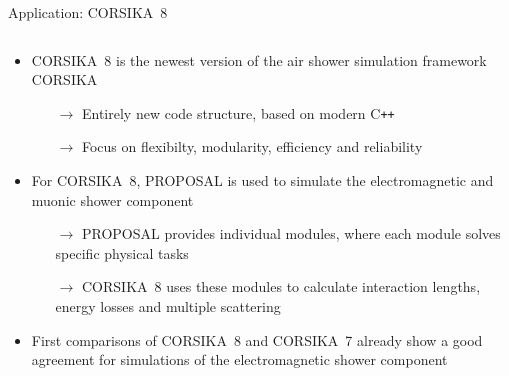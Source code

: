 \documentclass[t]{beamer}
\newlength{\itemseparation}
\begin{document}
  \begin{columns}[onlytextwidth]%
    \begin{column}{0.6\textwidth}%
      \begin{block}[equal height group=B]{Application: CORSIKA~8}%
          \begin{columns}[onlytextwidth]  
            \begin{column}{0.6\textwidth}%
              \begin{itemize}
                \setlength\itemsep{\itemseparation}
                \item CORSIKA~8 is the newest version of the air shower simulation framework CORSIKA
                \begin{itemize}
                  \setlength\itemsep{\itemseparation}
                  \item[$\rightarrow$] Entirely new code structure, based on modern C\texttt{++} 
                  \item[$\rightarrow$] Focus on flexibilty, modularity, efficiency and reliability \cite{Engel2018}
                \end{itemize}
                \item For CORSIKA~8, PROPOSAL is used to simulate the electromagnetic and muonic shower component
                \begin{itemize}
                  \setlength\itemsep{\itemseparation}
                  \item[$\rightarrow$] PROPOSAL provides individual modules, where each module solves specific physical tasks \cite{Alameddine_2020}
                  \item[$\rightarrow$] CORSIKA~8 uses these modules to calculate interaction lengths, energy losses and multiple scattering 
                \end{itemize}
                \item First comparisons of CORSIKA~8 and CORSIKA~7 already show a good agreement for simulations of the electromagnetic shower component \cite{Alameddine:2021iq}
              \end{itemize}

\vspace{2em}
\begin{center}
        \colorbox{light-gray}{
      \begin{minipage}{0.85\linewidth}



\end{minipage}}
\end{center}
\end{column}
\end{columns}
\end{block}
\end{column}
\end{columns}
\end{document}
